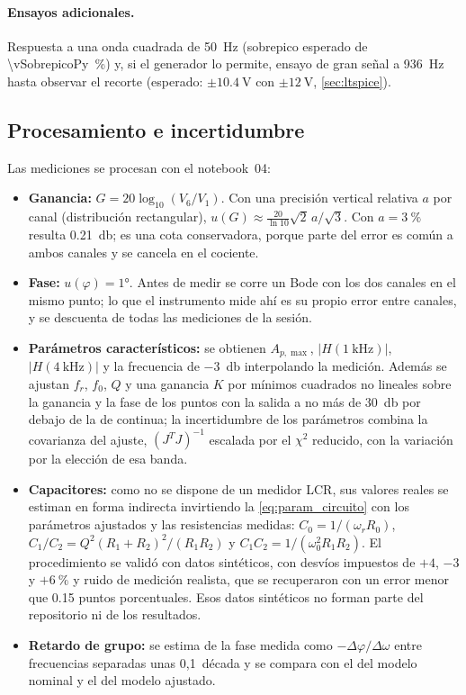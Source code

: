\paragraph{Ensayos adicionales.} Respuesta a una onda cuadrada de \qty{50}{\hertz} (sobrepico esperado de \qty{\vSobrepicoPy}{\percent}) y, si el
generador lo permite, ensayo de gran señal a \qty{936}{\hertz} hasta observar el recorte (esperado: $\pm\qty{10.4}{\volt}$ con $\pm\qty{12}{\volt}$,
\cref{sec:ltspice}).

\subsection{Procesamiento e incertidumbre}
Las mediciones se procesan con el notebook~04:
\begin{itemize}
  \item \textbf{Ganancia:} $G = 20\log_{10}(V_6/V_1)$. Con una precisión vertical relativa $a$ por canal (distribución rectangular),
        $u(G) \approx \frac{20}{\ln 10}\sqrt2\,a/\sqrt3$. Con $a = \qty{3}{\percent}$ resulta \qty{0.21}{\decibel}; es una cota conservadora, porque
        parte del error es común a ambos canales y se cancela en el cociente.
  \item \textbf{Fase:} $u(\varphi) = \ang{1}$. Antes de medir se corre un Bode con los dos canales en el mismo punto; lo que el instrumento mide ahí
        es su propio error entre canales, y se descuenta de todas las mediciones de la sesión.
  \item \textbf{Parámetros característicos:} se obtienen $A_{p,\max}$, $|H(\qty{1}{\kilo\hertz})|$, $|H(\qty{4}{\kilo\hertz})|$ y la frecuencia de
        \qty{-3}{\decibel} interpolando la medición. Además se ajustan $f_r$, $f_0$, $Q$ y una ganancia $K$ por mínimos cuadrados no lineales sobre
        la ganancia y la fase de los puntos con la salida a no más de \qty{30}{\decibel} por debajo de la de continua; la incertidumbre de los
        parámetros combina la covarianza del ajuste, $(J^TJ)^{-1}$ escalada por el $\chi^2$ reducido, con la variación por la elección de esa
        banda.
  \item \textbf{Capacitores:} como no se dispone de un medidor LCR, sus valores reales se estiman en forma indirecta invirtiendo la
        \cref{eq:param_circuito} con los parámetros ajustados y las resistencias medidas: $C_0 = 1/(\omega_rR_0)$,
        $C_1/C_2 = Q^2(R_1+R_2)^2/(R_1R_2)$ y $C_1C_2 = 1/(\omega_0^2R_1R_2)$. El procedimiento se validó con datos sintéticos, con desvíos
        impuestos de $+4$, $-3$ y $+\qty{6}{\percent}$ y ruido de medición realista, que se recuperaron con un error menor que
        \num{0.15} puntos porcentuales. Esos datos sintéticos no forman parte del repositorio ni de los resultados.
  \item \textbf{Retardo de grupo:} se estima de la fase medida como $-\Delta\varphi/\Delta\omega$ entre frecuencias separadas unas 0,1~década y se
        compara con el del modelo nominal y el del modelo ajustado.
\end{itemize}

